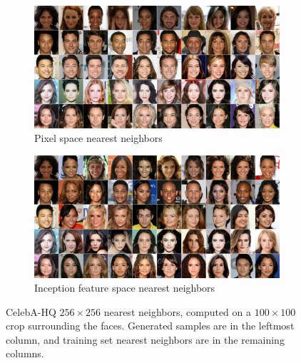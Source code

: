 \documentclass{article}
\begin{document}
\begin{figure}
  \centering
  \begin{subfigure}[b]{\textwidth}
    \includegraphics[width=\textwidth]{images/celebahq256_more_nnpixelspace.jpg}
    \caption{Pixel space nearest neighbors}
  \end{subfigure}
  \begin{subfigure}[b]{\textwidth}
    \includegraphics[width=\textwidth]{images/celebahq256_more_nninception.jpg}
    \caption{Inception feature space nearest neighbors}
  \end{subfigure}
  \caption{CelebA-HQ $256 \times 256$ nearest neighbors, computed on a $100\times100$ crop surrounding the faces. Generated samples are in the leftmost column, and training set nearest neighbors are in the remaining columns.}
  \label{fig:ext_celebahq256_nearest_neighbors_inception}
\end{figure}
\end{document}
